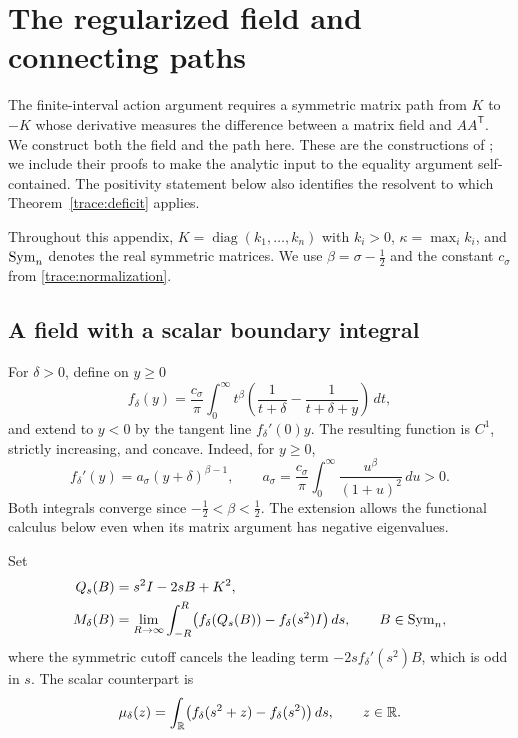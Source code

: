 \section{The regularized field and connecting paths}
\label{app:paths}

The finite-interval action argument requires a symmetric matrix path
from $K$ to $-K$ whose derivative measures the difference between a
matrix field and $AA^{\mathsf T}$.  We construct both the field and the
path here.  These are the constructions of \cite[Sections~4--5]{MLT};
we include their proofs to make the analytic input to the equality
argument self-contained.  The positivity statement below also
identifies the resolvent to which Theorem~\ref{trace:deficit} applies.

Throughout this appendix,
$K=\operatorname{diag}(k_1,\ldots,k_n)$ with $k_i>0$,
$\kappa=\max_i k_i$, and $\operatorname{Sym}_n$ denotes the real symmetric matrices.
We use $\beta=\sigma-\tfrac12$ and the constant $c_\sigma$ from
\eqref{trace:normalization}.

\subsection{A field with a scalar boundary integral}

For $\delta>0$, define on $y\geq0$
\begin{equation}\label{field:f}
 f_\delta(y)=\frac{c_\sigma}{\pi}\int_0^\infty t^\beta
       \left(\frac1{t+\delta}-\frac1{t+\delta+y}\right)\,dt,
\end{equation}
and extend to $y<0$ by the tangent line $f_\delta'(0)y$.
The resulting function is $C^1$, strictly increasing, and concave.
Indeed, for $y\geq0$,
\begin{equation}\label{field:f-derivative}
 f_\delta'(y)=a_\sigma(y+\delta)^{\beta-1},
 \qquad
 a_\sigma=\frac{c_\sigma}{\pi}
       \int_0^\infty\frac{u^\beta}{(1+u)^2}\,du>0.
\end{equation}
Both integrals converge since $-\tfrac12<\beta<\tfrac12$.
The extension allows the functional calculus below even when its
matrix argument has negative eigenvalues.

Set
\begin{equation}\label{field:definition}
 \begin{split}
 Q_s(B)&=s^2I-2sB+K^2,\\
 M_\delta(B)&=\lim_{R\to\infty}\int_{-R}^{R}
       \bigl(f_\delta(Q_s(B))-f_\delta(s^2)I\bigr)\,ds,
       \qquad B\in\operatorname{Sym}_n,
 \end{split}
\end{equation}
where the symmetric cutoff cancels the leading term
$-2s f_\delta'(s^2)B$, which is odd in $s$.
The scalar counterpart is
\begin{equation}\label{field:mu}
 \mu_\delta(z)=\int_\mathbb R
     \bigl(f_\delta(s^2+z)-f_\delta(s^2)\bigr)\,ds,
       \qquad z\in\mathbb R.
\end{equation}


